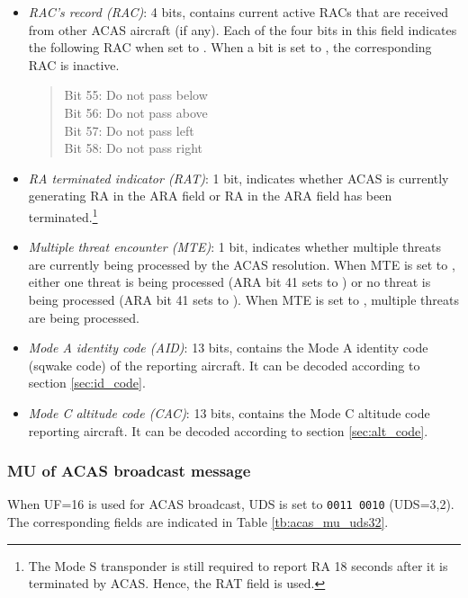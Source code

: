 \begin{itemize}
  \item \emph{RAC's record (RAC)}: 4 bits, contains current active RACs that are received from other ACAS aircraft (if any). Each of the four bits in this field indicates the following RAC when set to \1. When a bit is set to \0, the corresponding RAC is inactive.

  \begin{quote}
    \small
    Bit 55: Do not pass below \\
    Bit 56: Do not pass above \\
    Bit 57: Do not pass left \\
    Bit 58: Do not pass right
  \end{quote}


  \item \emph{RA terminated indicator (RAT)}: 1 bit, indicates whether ACAS is currently generating RA in the ARA field or RA in the ARA field has been terminated.\footnote{The Mode S transponder is still required to report RA 18 seconds after it is terminated by ACAS. Hence, the RAT field is used.}


  \item \emph{Multiple threat encounter (MTE)}: 1 bit, indicates whether multiple threats are currently being processed by the ACAS resolution. When MTE is set to \0, either one threat is being processed (ARA bit 41 sets to \1) or no threat is being processed (ARA bit 41 sets to \0). When MTE is set to \1, multiple threats are being processed.

  \item \emph{Mode A identity code (AID)}: 13 bits, contains the Mode A identity code (sqwake code) of the reporting aircraft. It can be decoded according to section \ref{sec:id_code}.

  \item \emph{Mode C altitude code (CAC)}: 13 bits, contains the Mode C altitude code reporting aircraft. It can be decoded according to section \ref{sec:alt_code}.


\end{itemize}



\subsubsection{MU of ACAS broadcast message}

When UF=16 is used for ACAS broadcast, UDS is set to \texttt{0011 0010} (UDS=3,2). The corresponding fields are indicated in Table \ref{tb:acas_mu_uds32}.

